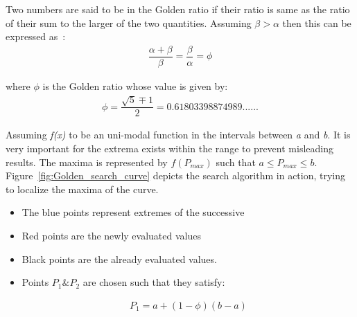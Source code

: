 {Two numbers are said to be in the Golden ratio if their ratio is same as the ratio of their sum to the larger of the two quantities. Assuming $\beta > \alpha$ then this can be expressed as~\cite{Gill81MurrayWright}:\\

\begin{equation}
	\begin{aligned}
		\dfrac{\alpha+\beta}{\beta}=\dfrac{\beta}{\alpha}=\phi
		\label{eq:golden_ratio1}
	\end{aligned}
\end{equation}

where ${\phi}$ is the Golden ratio whose value is given by:\\

\begin{equation}
	\begin{aligned}
		 \phi=\dfrac{\sqrt{5}\mp1}{2}= 0.61803398874989......
		\label{eq:golden_ratio}
	\end{aligned}
\end{equation}
 
 
 Assuming \textit{f(x)} to be an uni-modal function in the intervals between  \textit{a} and \textit{b}. It is very important for the extrema exists within the range to prevent misleading results. The maxima is represented by $\textit{f}(P_{\textit{max}})$ such that $a\leq P_{\textit{max}} \leq b $. Figure~\ref{fig:Golden_search_curve} depicts the search algorithm in action, trying to localize the maxima of the curve. 
  
 \begin{itemize}
  	 \item The blue points represent extremes of the successive
  	 \item Red points  are the newly evaluated values
  	 \item Black points are the already evaluated values.
   \end{itemize}
   
 \begin{itemize}
 
 \item Points $P_{1} \& P_{2}$ are chosen such that they satisfy:
 
\begin{equation}
	\begin{aligned}
		 P_{1}=a+(1-\phi)(b-a)
		\label{eq:golden_ratio_p1}
	\end{aligned}
\end{equation}


\end{itemize}}
